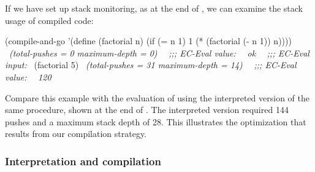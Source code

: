 \noindent
If we have set up stack monitoring, as at the end of , we
can examine the stack usage of compiled code:

\begin{codeBlock}
(compile-and-go
 '(define (factorial n)
    (if (= n 1)
        1
        (* (factorial (- n 1)) n))))
~\textit{(total-pushes = 0 maximum-depth = 0)}~
~\textit{;;; EC-Eval value:}~
~\textit{ok}~
~\textit{;;; EC-Eval input:}~
(factorial 5)
~\textit{(total-pushes = 31 maximum-depth = 14)}~
~\textit{;;; EC-Eval value:}~
~\textit{120}~
\end{codeBlock}

\noindent
Compare this example with the evaluation of  using the
interpreted version of the same procedure, shown at the end of
.  The interpreted version required 144 pushes and a maximum stack
depth of 28.  This illustrates the optimization that results from our
compilation strategy.

\subsubsection*{Interpretation and compilation}

